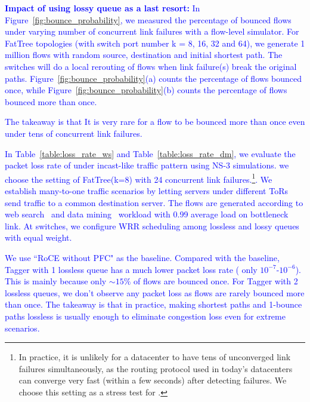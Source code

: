 \textcolor{blue}{\textbf{Impact of using lossy queue as a last resort:} In Figure~\ref{fig:bounce_probability}, we measured the percentage of bounced flows under varying number of concurrent link failures with a flow-level simulator. For FatTree topologies (with switch port number k = 8, 16, 32 and 64), we generate 1 million flows with random source, destination and initial shortest path. The switches will do a local rerouting of flows when link failure(s) break the original paths. Figure~\ref{fig:bounce_probability}(a) counts the percentage of flows bounced once, while Figure~\ref{fig:bounce_probability}(b) counts the percentage of flows bounced more than once.}

\textcolor{blue}{The takeaway is that It is very rare for a flow to be bounced more than once even under tens of concurrent link failures.}



\textcolor{blue}{In Table~\ref{table:loss_rate_ws} and Table~\ref{table:loss_rate_dm}, we evaluate the packet loss rate of \sysname{} under incast-like traffic pattern using NS-3 simulations. we choose the setting of FatTree(k=8) with 24 concurrent link failures.\footnote{In practice, it is unlikely for a datacenter to have tens of unconverged link failures simultaneously, as the routing protocol used in today's datacenters can converge very fast (within a few seconds) after detecting failures. We choose this setting as a stress test for \sysname{} .}. We establish many-to-one traffic scenarios by letting servers under different ToRs send traffic to a common destination server.  The flows are generated according to web search~\cite{dctcp} and data mining~\cite{vl2}  workload with 0.99 average load on bottleneck link. At switches, we configure WRR scheduling among lossless and lossy queues with equal weight.}

\textcolor{blue}{We use ``RoCE without PFC" as the baseline. 
Compared with the baseline, Tagger with 1 lossless queue has a much lower packet loss rate ( only $10^{-7}$-$10^{-6}$). This is mainly because 
only $\sim 15\%$ of flows are bounced once. For Tagger with 2 lossless queues, we don't observe any packet loss as flows are rarely bounced more than once.  The takeaway is that in practice, making shortest paths and 1-bounce paths lossless is usually enough to eliminate congestion loss even for extreme scenarios.}

